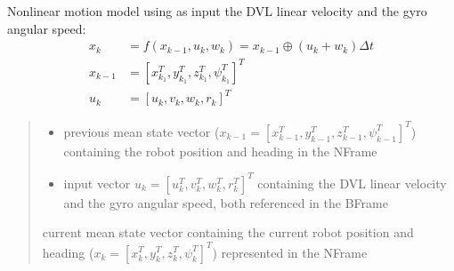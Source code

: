 \documentclass[letterpaper,10pt,english]{sphinxmanual}
\begin{document}
\begin{fulllineitems}
\begin{fulllineitems}
\begin{quote}
\begin{description}
\end{description}\end{quote}

\end{fulllineitems}


\begin{fulllineitems}
\label{\detokenize{GFLocalization:EKF_4DOFAUV_InputVelocityMM_DVLDepthYawOM.EKF_4DOFAUV_InputVelocityMM_DVLDepthYawOM.f}}
\pysigstartsignatures
{}
\pysigstopsignatures
\sphinxAtStartPar
Non\sphinxhyphen{}linear motion model using as input the DVL linear velocity and the gyro angular speed:
\begin{equation*}
\begin{split}x_k&=f(x_{k-1},u_k,w_k) = x_{k-1} \oplus (u_k + w_k) \Delta t \\
x_{k-1}&=[x_{k_1}^T, y_{k_1}^T, z_{k_1}^T, \psi_{k_1}^T]^T\\
u_k&=[u_k, v_k, w_k, r_k]^T\end{split}
\end{equation*}\begin{quote}\begin{description}
\begin{itemize}
\item {} 
\sphinxAtStartPar
{} \textendash{} previous mean state vector (\(x_{k-1}=[x_{k-1}^T, y_{k-1}^T, z_{k-1}^T, \psi_{k-1}^T]^T\)) containing the robot position and heading in the N\sphinxhyphen{}Frame

\item {} 
\sphinxAtStartPar
{} \textendash{} input vector \(u_k=[u_k^T, v_k^T, w_k^T, r_k^T]^T\) containing the DVL linear velocity and the gyro angular speed, both referenced in the B\sphinxhyphen{}Frame

\end{itemize}

\sphinxAtStartPar
current mean state vector containing the current robot position and heading (\(x_k=[x_k^T, y_k^T, z_k^T, \psi_k^T]^T\)) represented in the N\sphinxhyphen{}Frame


\end{description}
\end{quote}
\end{fulllineitems}
\end{fulllineitems}
\end{document}
